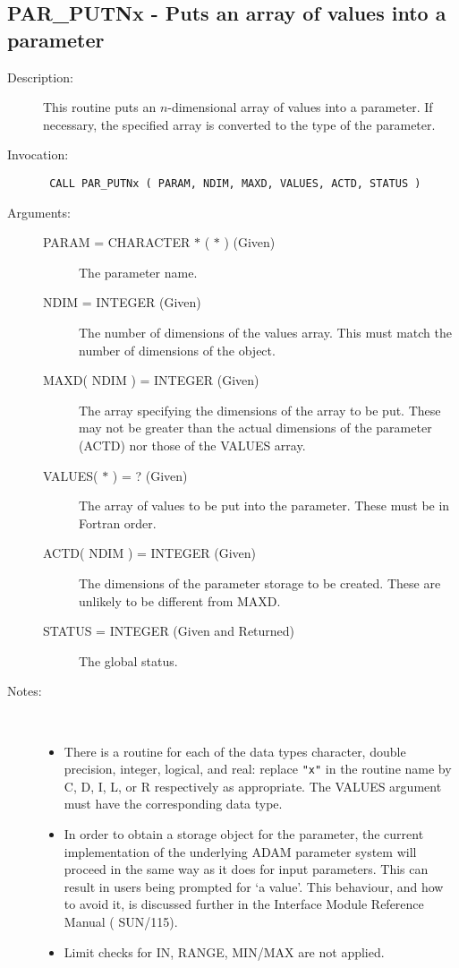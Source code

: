 \documentclass[twoside,11pt]{article}
\newcommand{\xref}[3]{#1}
\newcommand{\xlabel}[1]{}
\newlength{\sstbannerlength}
\newlength{\sstcaptionlength}
\newlength{\sstexampleslength}
\newlength{\sstexampleswidth}
\newcommand{\sstroutine}[3]{
   \goodbreak
   \rule{\textwidth}{0.5mm}
   \vspace{-7ex}
   \newline
   \settowidth{\sstbannerlength}{{\Large {\bf #1}}}
   \setlength{\sstcaptionlength}{\textwidth}
   \setlength{\sstexampleslength}{\textwidth}
   \addtolength{\sstbannerlength}{0.5em}
   \addtolength{\sstcaptionlength}{-2.0\sstbannerlength}
   \addtolength{\sstcaptionlength}{-5.0pt}
   \settowidth{\sstexampleswidth}{{\bf Examples:}}
   \addtolength{\sstexampleslength}{-\sstexampleswidth}
   \parbox[t]{\sstbannerlength}{\flushleft{\Large {\bf #1}}}
   \parbox[t]{\sstcaptionlength}{\center{\Large #2}}
   \parbox[t]{\sstbannerlength}{\flushright{\Large {\bf #1}}}
   \begin{description}
      #3
   \end{description}
}
\newcommand{\sstdescription}[1]{\item[Description:] #1}
\newcommand{\sstinvocation}[1]{\item[Invocation:]\hspace{0.4em}{\tt #1}}
\newcommand{\sstarguments}[1]{
   \item[Arguments:] \mbox{} \\
   \vspace{-3.5ex}
   \begin{description}
      #1
   \end{description}
}
\newcommand{\sstsubsection}[1]{ \item[{#1}] \mbox{} \\}
\newcommand{\sstnotes}[1]{\item[Notes:] \mbox{} \\[1.3ex] #1}
\newcommand{\sstitemlist}[1]{
  \mbox{} \\
  \vspace{-7ex}
  \begin{itemize}
     #1
  \end{itemize}
}
\newcommand{\sstitem}{\item}
\newcommand{\ssttt}{\tt}
\renewcommand{\sstroutine}[3]{
      \subsection{\xlabel{12}#1\xlabel{#1}-\label{#1}#2}
      \begin{description}
         #3
      \end{description}
   }
\renewcommand{\sstdescription}[1]{\item[Description:]
      \begin{description}
         #1
      \end{description}
   }
\renewcommand{\sstinvocation}[1]{\item[Invocation:]
      \begin{description}
         {\ssttt #1}
      \end{description}
   }
\renewcommand{\sstarguments}[1]{
      \item[Arguments:]
      \begin{description}
         #1
      \end{description}
   }
\renewcommand{\sstsubsection}[1]{\item[{#1}]}
\renewcommand{\sstnotes}[1]{\item[Notes:]
      \begin{description}
         #1
      \end{description}
   }
\newcommand{\sstitemlist}[1]{
      \begin{itemize}
         #1
      \end{itemize}
   }
\begin{document}
\sstroutine{
   PAR\_PUTNx
}{
   Puts an array of values into a parameter
}{
   \sstdescription{
      This routine puts an $n$-dimensional array of values into a
      parameter.  If necessary, the specified array is converted to
      the type of the parameter.
   }
   \sstinvocation{
      CALL PAR\_PUTNx ( PARAM, NDIM, MAXD, VALUES, ACTD, STATUS )
   }
   \sstarguments{
      \sstsubsection{
         PARAM = CHARACTER $*$ ( $*$ ) (Given)
      }{
         The parameter name.
      }
      \sstsubsection{
         NDIM = INTEGER (Given)
      }{
         The number of dimensions of the values array.  This must match
         the number of dimensions of the object.
      }
      \sstsubsection{
         MAXD( NDIM ) = INTEGER (Given)
      }{
         The array specifying the dimensions of the array to be put.
         These may not be greater than the actual dimensions of the
         parameter (ACTD) nor those of the VALUES array.
      }
      \sstsubsection{
         VALUES( $*$ ) = ? (Given)
      }{
         The array of values to be put into the parameter.  These must
         be in Fortran order.
      }
      \sstsubsection{
         ACTD( NDIM ) = INTEGER (Given)
      }{
         The dimensions of the parameter storage to be created. These are
         unlikely to be different from MAXD.

      }
      \sstsubsection{
         STATUS = INTEGER (Given and Returned)
      }{
         The global status.
      }
   }
   \sstnotes{
      \sstitemlist{

         \sstitem
         There is a routine for each of the data types character,
         double precision, integer, logical, and real: replace {\tt "x"} in the
         routine name by C, D, I, L, or R respectively as appropriate.  The
         VALUES argument must have the corresponding data type.

         \sstitem
         In order to obtain a storage object for the parameter, the
         current implementation of the underlying ADAM parameter system
         will proceed in the same way as it does for input parameters.
         This can result in users being prompted for `a value'. This
         behaviour, and how to avoid it, is discussed further in the
         Interface Module Reference Manual (
         \xref{SUN/115}{sun115}{}).

         \sstitem
         Limit checks for IN, RANGE, MIN/MAX are not applied.
      }
   }
}
\end{document}
